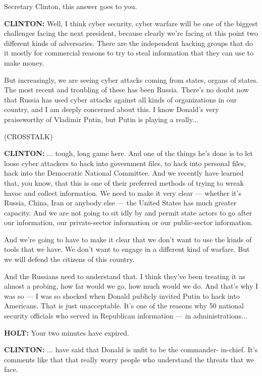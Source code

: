 Secretary Clinton, this answer goes to you.

\textbf{CLINTON:} Well, I think cyber security, cyber warfare will be
one of the biggest challenges facing the next president, because clearly
we're facing at this point two different kinds of adversaries. There are
the independent hacking groups that do it mostly for commercial reasons
to try to steal information that they can use to make money.

But increasingly, we are seeing cyber attacks coming from states, organs
of states. The most recent and troubling of these has been Russia.
There's no doubt now that Russia has used cyber attacks against all
kinds of organizations in our country, and I am deeply concerned about
this. I know Donald's very praiseworthy of Vladimir Putin, but Putin is
playing a really...

(CROSSTALK)

\textbf{CLINTON:} ... tough, long game here. And one of the things he's
done is to let loose cyber attackers to hack into government files, to
hack into personal files, hack into the Democratic National Committee.
And we recently have learned that, you know, that this is one of their
preferred methods of trying to wreak havoc and collect information. We
need to make it very clear --- whether it's Russia, China, Iran or
anybody else --- the United States has much greater capacity. And we are
not going to sit idly by and permit state actors to go after our
information, our private-sector information or our public-sector
information.

And we're going to have to make it clear that we don't want to use the
kinds of tools that we have. We don't want to engage in a different kind
of warfare. But we will defend the citizens of this country.

And the Russians need to understand that. I think they've been treating
it as almost a probing, how far would we go, how much would we do. And
that's why I was so --- I was so shocked when Donald publicly invited
Putin to hack into Americans. That is just unacceptable. It's one of the
reasons why 50 national security officials who served in Republican
information --- in administrations...

\textbf{HOLT:} Your two minutes have expired.

\textbf{CLINTON:} ... have said that Donald is unfit to be the
commander- in-chief. It's comments like that that really worry people
who understand the threats that we face.

